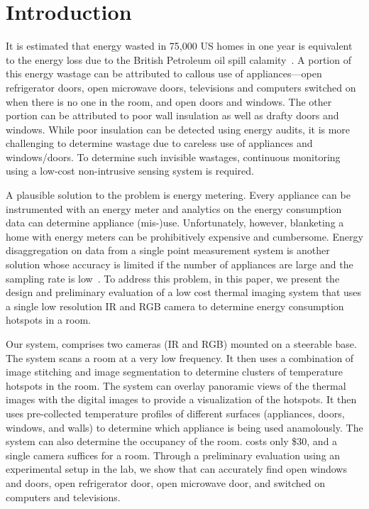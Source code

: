 \section{Introduction}
\label{sec:intro}

It is estimated that energy wasted in 75,000 US homes in one year is equivalent to the energy loss due to the British Petroleum oil
spill calamity~\cite{XX}. A portion of this energy wastage can be attributed to callous use of appliances---open refrigerator doors,
open microwave doors, televisions and computers switched on when there is no one in the room, and open doors and windows. The other
portion can be attributed to poor wall insulation as well as drafty doors and windows. While poor insulation can be detected using
energy audits, it is more challenging to determine wastage due to careless use of appliances and windows/doors. To determine such
invisible wastages, continuous monitoring using a low-cost non-intrusive sensing system is required.

A plausible solution to the problem is energy metering. Every appliance can be instrumented with an energy meter and analytics on the
energy consumption data can determine appliance (mis-)use. Unfortunately, however, blanketing a home with energy meters can be
prohibitively expensive and cumbersome. Energy disaggregation on data from a single point measurement system is another solution 
whose accuracy is limited if the number of appliances are large and the sampling rate is low~\cite{XX}. To address this problem, in
this paper, we present the design and preliminary evaluation of a low cost thermal imaging system that uses a single low resolution IR
and RGB camera to determine energy consumption hotspots in a room.

Our system, {\IRLeak} comprises two cameras (IR and RGB) mounted on a steerable base. The system scans a room at a very low frequency. It then uses a combination of image stitching and image segmentation to determine clusters of temperature hotspots in the room. The system can overlay panoramic views of the thermal images with the digital images to provide a visualization of the hotspots. It then uses pre-collected temperature profiles of different surfaces (appliances, doors, windows, and walls) to determine which appliance is being used anamolously. The system can also determine the occupancy of the room. {\IRLeak} costs only \$30, and a single camera suffices for a room. Through a preliminary evaluation using an experimental setup in the lab, we show that {\IRLeak} can accurately find open windows and doors, open refrigerator door, open microwave door, and switched on computers and televisions. 

